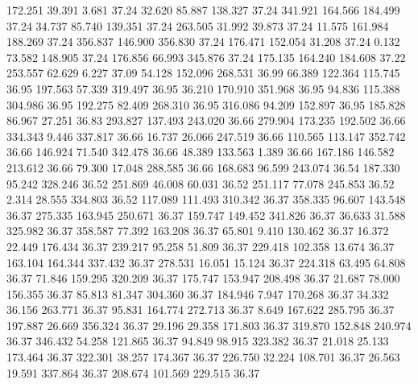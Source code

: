  172.251   39.391    3.681        37.24
  32.620   85.887  138.327        37.24
 341.921  164.566  184.499        37.24
  34.737   85.740  139.351        37.24
 263.505   31.992   39.873        37.24
  11.575  161.984  188.269        37.24
 356.837  146.900  356.830        37.24
 176.471  152.054   31.208        37.24
   0.132   73.582  148.905        37.24
 176.856   66.993  345.876        37.24
 175.135  164.240  184.608        37.22
 253.557   62.629    6.227        37.09
  54.128  152.096  268.531        36.99
  66.389  122.364  115.745        36.95
 197.563   57.339  319.497        36.95
  36.210  170.910  351.968        36.95
  94.836  115.388  304.986        36.95
 192.275   82.409  268.310        36.95
 316.086   94.209  152.897        36.95
 185.828   86.967   27.251        36.83
 293.827  137.493  243.020        36.66
 279.904  173.235  192.502        36.66
 334.343    9.446  337.817        36.66
  16.737   26.066  247.519        36.66
 110.565  113.147  352.742        36.66
 146.924   71.540  342.478        36.66
  48.389  133.563    1.389        36.66
 167.186  146.582  213.612        36.66
  79.300   17.048  288.585        36.66
 168.683   96.599  243.074        36.54
 187.330   95.242  328.246        36.52
 251.869   46.008   60.031        36.52
 251.117   77.078  245.853        36.52
   2.314   28.555  334.803        36.52
 117.089  111.493  310.342        36.37
 358.335   96.607  143.548        36.37
 275.335  163.945  250.671        36.37
 159.747  149.452  341.826        36.37
  36.633   31.588  325.982        36.37
 358.587   77.392  163.208        36.37
  65.801    9.410  130.462        36.37
  16.372   22.449  176.434        36.37
 239.217   95.258   51.809        36.37
 229.418  102.358   13.674        36.37
 163.104  164.344  337.432        36.37
 278.531   16.051   15.124        36.37
 224.318   63.495   64.808        36.37
  71.846  159.295  320.209        36.37
 175.747  153.947  208.498        36.37
  21.687   78.000  156.355        36.37
  85.813   81.347  304.360        36.37
 184.946    7.947  170.268        36.37
  34.332   36.156  263.771        36.37
  95.831  164.774  272.713        36.37
   8.649  167.622  285.795        36.37
 197.887   26.669  356.324        36.37
  29.196   29.358  171.803        36.37
 319.870  152.848  240.974        36.37
 346.432   54.258  121.865        36.37
  94.849   98.915  323.382        36.37
  21.018   25.133  173.464        36.37
 322.301   38.257  174.367        36.37
 226.750   32.224  108.701        36.37
  26.563   19.591  337.864        36.37
 208.674  101.569  229.515        36.37
